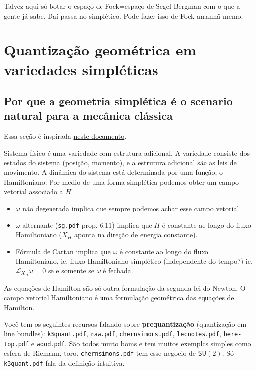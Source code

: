 Talvez aqui só botar o espaço de Fock=espaço de Segel-Bergman com o que a gente já sabe. Daí passa no simplético. Pode fazer isso de Fock amanhã memo.

\section{Quantização geométrica em variedades simpléticas}

\subsection{Por que a geometria simplética é o scenario natural para a mecânica clássica}

Essa seção é inspirada \href{https://cohn.mit.edu/symplectic/}{neste documento}.

Sistema f\'isico \'e uma variedade com estrutura adicional. A variedade consiste dos estados do sistema (posi\c c\~ao, momento), e a estrutura adicional s\~ao as leis de movimento. A din\^amica do sistema est\'a determinada por uma fun\c c\~ao, o Hamiltoniano. Por medio de uma forma simpl\'etica podemos obter um campo vetorial associado a $H$ 

\begin{itemize}
\item $\omega$ n\~ao degenerada implica que sempre podemos achar esse campo vetorial

\item  $\omega$ alternante (\texttt{sg.pdf} prop. 6.11) implica que $H$ \'e constante ao longo do fluxo Hamiltoniano ($X_H$ aponta na  dire\c c\~ao de energia constante).

\item F\'ormula de Cartan implica que $\omega$  \'e constante ao longo do fluxo Hamiltoniano, ie. fluxo Hamiltoniano simpl\'etico (independente do tempo?) ie. $\mathcal{L}_{X_H}\omega=0$ se e somente se $\omega$ \'e fechada.
\end{itemize}

As equa\c c\~oes de Hamilton s\~ao s\'o outra formula\c c\~ao da segunda lei do Newton. O campo vetorial Hamiltoniano \'e uma formula\c c\~ao geom\'etrica das equa\c c\~oes de Hamilton.

\iffalse
{\color{3}Você tem os seguintes recursos falando sobre \textbf{prequantização}  (quantização em line bundles): \texttt{k3quant.pdf}, \texttt{raw.pdf}, \texttt{chernsimons.pdf}, \texttt{lecnotes.pdf},  \texttt{bere-top.pdf} e \texttt{wood.pdf}. São todos muito boms e tem muitos exemplos simples como esfera de Riemann, toro. \texttt{chernsimons.pdf} tem esse negocio de $\mathsf{SU}(2)$. Só \texttt{k3quant.pdf} fala da definição intuitiva.}

